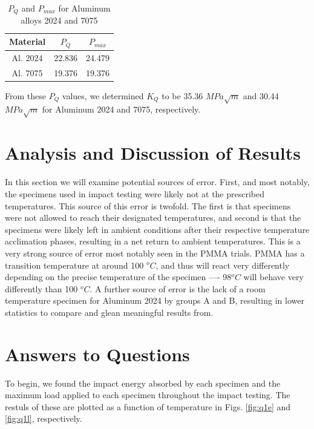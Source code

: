 \documentclass{article}
\begin{document}
\begin{table}[!h!]
    \centering
    \caption{$P_Q$ and $P_{max}$ for Aluminum alloys 2024 and 7075}
    \begin{tabular}{|c|c|c|}
         \toprule
         \hline
         Material & $P_Q$ & $P_{max}$ \\
         \toprule
         \bottomrule
         Al. 2024 & 22.836 & 24.479 \\ 
         \hline
         Al. 7075 & 19.376 & 19.376 \\
         \hline
    \end{tabular}

    \label{tab:q4}
\end{table}

From these $P_Q$ values, we determined $K_Q$ to be 35.36 $MPa\sqrt{m}$ and 30.44 $MPa\sqrt{m}$ for Aluminum 2024 and 7075, respectively.

\newpage
\section{Analysis and Discussion of Results}

In this section we will examine potential sources of error. First, and most notably, the specimens used in impact testing were likely not at the prescribed temperatures. This source of this error is twofold. The first is that specimens were not allowed to reach their designated temperatures, and second is that the specimens were likely left in ambient conditions after their respective temperature acclimation phases, resulting in a net return to ambient temperatures. This is a very strong source of error most notably seen in the PMMA trials. PMMA has a transition temperature at around 100 $^oC$, and thus will react very differently depending on the precise temperature of the specimen ---- 98$^oC$ will behave very differently than 100 $^oC$. A further source of error is the lack of a room temperature specimen for Aluminum 2024 by groups A and B, resulting in lower statistics to compare and glean meaningful results from. 


\section{Answers to Questions}

To begin, we found the impact energy absorbed by each specimen and the maximum load applied to each specimen throughout the impact testing. The restuls of these are plotted as a function of temperature in Figs. \ref{fig:q1e} and \ref{fig:q1l}, respectively.
\end{document}
